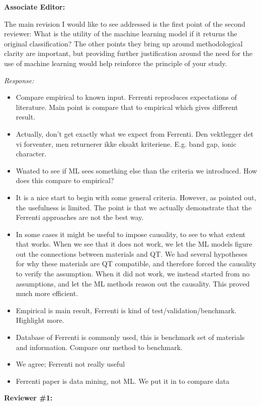 \documentclass[11pt, a4paper]{letter} %
\begin{document}
\noindent
\textbf{Associate Editor:}

The main revision I would like to see addressed is the first point of the second reviewer: What is the utility of the machine learning model if it returns the original classification? The other points they bring up around methodological clarity are important, but providing further justification around the need for the use of machine learning would help reinforce the principle of your study. 


\textit{Response: }
\begin{itemize}
    \item	Compare empirical to known input. Ferrenti reproduces expectations of literature. Main point is compare that to empirical which gives different result. 
    \item Actually, don’t get exactly what we expect from Ferrenti. Den vektlegger det vi forventer, men returnerer ikke eksakt kriteriene. E.g. band gap, ionic character. 
    \item Wnated to see if ML sees something else than the criteria we introduced. How does this compare to empirical? 
    \item It is a nice start to begin with some general criteria. However, as pointed out, the usefulness is limited. The point is that we actually demonstrate that the Ferrenti approaches are not the best way. 
    \item In some cases it might be useful to impose causality, to see to what extent that works. When we see that it does not work, we let the ML models figure out the connections between materials and QT. We had several hypotheses for why these materials are QT compatible, and therefore forced the causality to verify the assumption. When it did not work, we instead started from no assumptions, and let the ML methods reason out the causality. This proved much more efficient. 
    \item Empirical is main result, Ferrenti is kind of test/validation/benchmark. Highlight more. 
    \item Database of Ferrenti is commonly used, this is benchmark set of materials and information. Compare our method to benchmark. 
    \item We agree; Ferrenti not really useful 
    \item Ferrenti paper is data mining, not ML. We put it in to compare data 
\end{itemize}

\noindent
\textbf{Reviewer \#1: }
\end{document}
